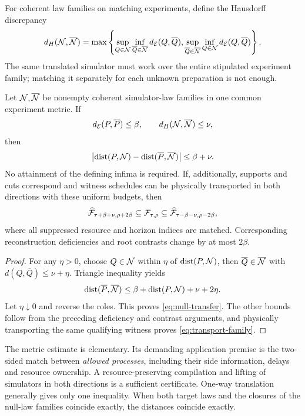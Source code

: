 For coherent law families on matching experiments, define the Hausdorff discrepancy
\begin{equation}\label{eq:hausdorff}
 d_H(\mathcal N,\overline{\mathcal N})=
 \max\left\{
 \sup_{Q\in\mathcal N}\inf_{\overline Q\in\overline{\mathcal N}}d_{\mathcal E}(Q,\overline Q),
 \sup_{\overline Q\in\overline{\mathcal N}}\inf_{Q\in\mathcal N}d_{\mathcal E}(Q,\overline Q)
 \right\}.
\end{equation}
The same translated simulator must work over the entire stipulated experiment family; matching it separately for each unknown preparation is not enough.

\begin{theorem}\label{p2-23}
Let \(\mathcal N,\overline{\mathcal N}\) be nonempty coherent simulator-law families in one common experiment metric. If
\[
 d_{\mathcal E}(P,\overline P)\le\beta,
 \qquad d_H(\mathcal N,\overline{\mathcal N})\le\nu,
\]
then
\begin{equation}\label{eq:null-transfer}
 \left|\operatorname{dist}(P,\mathcal N)-\operatorname{dist}(\overline P,\overline{\mathcal N})\right|
 \le\beta+\nu.
\end{equation}
No attainment of the defining infima is required. If, additionally, supports and cuts correspond and witness schedules can be physically transported in both directions with these uniform budgets, then
\begin{equation}\label{eq:transport-family}
 \widehat{\mathcal F}_{\tau+\beta+\nu,\rho+2\beta}
 \subseteq\mathcal F_{\tau,\rho}
 \subseteq\widehat{\mathcal F}_{\tau-\beta-\nu,\rho-2\beta},
\end{equation}
where all suppressed resource and horizon indices are matched. Corresponding reconstruction deficiencies and root contrasts change by at most \(2\beta\).
\end{theorem}
\begin{proof}
For any \(\eta>0\), choose \(Q\in\mathcal N\) within \(\eta\) of \(\operatorname{dist}(P,\mathcal N)\), then \(\overline Q\in\overline{\mathcal N}\) with \(d(Q,\overline Q)\le\nu+\eta\). Triangle inequality yields
\[
 \operatorname{dist}(\overline P,\overline{\mathcal N})
 \le\beta+\operatorname{dist}(P,\mathcal N)+\nu+2\eta.
\]
Let \(\eta\downarrow0\) and reverse the roles. This proves \cref{eq:null-transfer}. The other bounds follow from the preceding deficiency and contrast arguments, and physically transporting the same qualifying witness proves \cref{eq:transport-family}.
\end{proof}
The metric estimate is elementary. Its demanding application premise is the two-sided match between \emph{allowed processes}, including their side information, delays and resource ownership. A resource-preserving compilation and lifting of simulators in both directions is a sufficient certificate. One-way translation generally gives only one inequality. When both target laws and the closures of the null-law families coincide exactly, the distances coincide exactly.

